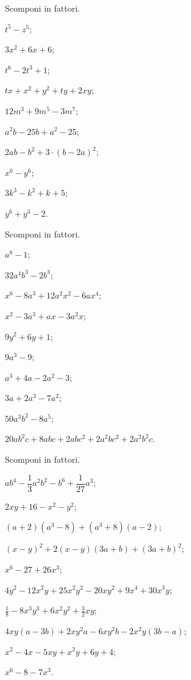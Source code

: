 \begin{esercizio}
 Scomponi in fattori.
 \begin{multicols}{2}
 \begin{enumeratea}
\item $t^{5}-z^{5}$;
\item $3x^{2}+6x+6$;
\item $t^{{6}}-2t^{{3}}+1$;
\item $tx+x^{2}+y^{2}+ty+2xy$;
\item $12m^{3}+9m^{5}-3m^{7}$;
\item $a^{2}b-25b+a^{2}-25$;
\item $2ab-b^{2}+3\cdot \left(b-2a\right)^{2}$;
\item $x^{{6}}-y^{{6}}$;
\item $3k^{{3}}-k^{2}+k+5$;
\item $y^{{6}}+y^{{3}}-2$.
 \end{enumeratea}
 \end{multicols}
\end{esercizio}

\begin{esercizio}
 Scomponi in fattori.

 \begin{enumeratea}
\item $a^{{8}}-1$;
\item $32a^{4}b^{3} - 2b^{3}$;
\item $x^{6} - 8a^{3} + 12a^{2}x^{2} - 6ax^{4}$;
\item $x^{2} - 3a^{3} + ax - 3a^{2}x$;
\item $9y^{2}+6y+1$;
\item $9a^{3}-9$;
\item $a^{3}+4a-2a^{2}-3$;
\item $3a+2a^{3}-7a^{2}$;
\item $50a^{3}b^{2}-8a^{5}$;
\item $20ab^{2}c+8abc+2abc^{2}+2a^{2}bc^{2}+2a^{2}b^{2}c$.
 \end{enumeratea}
\end{esercizio}

\begin{esercizio}
 Scomponi in fattori.
 \begin{enumeratea}
 \item $ab^{4}-\dfrac{1}{3}a^{2}b^{2}-b^{6}+\dfrac{1}{27}a^{3}$;
\item $2xy+16-x^{2}-y^{2}$;
\item $(a+2)\left(a^{3}-8\right)+\left(a^{3}+8\right)(a-2)$;
\item $(x-y)^{2}+2(x-y)(3a+b)+(3a+b)^{2}$;
\item $x^{6}-27+26x^{3}$;
\item $4y^{2}-12x^{2}y+25x^{2}y^{2}-20xy^{2}+9x^{4}+30x^{3}y$;
\item $\frac{1}{8}-8x^{3}y^{3}+6x^{2}y^{2}+\frac{3}{2}xy$;
\item $4xy(a-3b)+2xy^{2}a-6xy^{2}b-2x^{2}y(3b-a)$;
\item $x^{2}-4x-5xy+x^{2}y+6y+4$;
\item $x^{6}-8-7x^{3}$.
 \end{enumeratea}
\end{esercizio}

